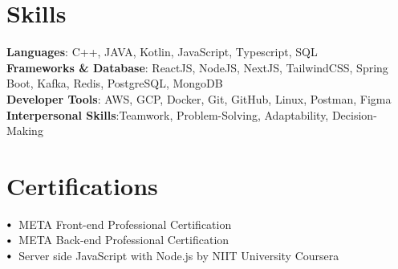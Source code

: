 \documentclass[letterpaper,11pt]{article}
\newcommand\sbullet[1][.5]{\mathbin{\vcenter{\hbox{\scalebox{#1}{$\bullet$}}}}}
\begin{document}
\section{Skills}
 \begin{itemize}[leftmargin=0.15in, label={}]
    \small{\item{
     \textbf{Languages}{: C++, JAVA, Kotlin, JavaScript, Typescript, SQL} \\
     \vspace{2pt}
     \textbf{Frameworks \& Database}{: ReactJS, NodeJS, NextJS, TailwindCSS, Spring Boot, Kafka, Redis, PostgreSQL, MongoDB} \\
     \vspace{2pt}
     \textbf{Developer Tools}{: AWS, GCP, Docker, Git, GitHub, Linux, Postman, Figma} \\
     \vspace{2pt}
     \textbf{Interpersonal Skills}{:Teamwork, Problem-Solving, Adaptability, Decision-Making} \\
    }}
 \end{itemize}
 \vspace{-14pt}

\section{Certifications}

$\sbullet[.75] \hspace{0.1cm}$ 
{{META Front-end Professional Certification}} {\href{https://coursera.org/share/0a950a3994e4aa550d83de3a782688bc}{\raisebox{-0.1\height}\faExternalLink }}
\hspace{2cm}\\

$\sbullet[.75] \hspace{0.1cm}$ 
{{META Back-end  Professional Certification}} {\href{https://coursera.org/share/f0c890d8a5227e31c6542d93b11cdc7b}{\raisebox{-0.1\height}\faExternalLink }}
\hspace{2cm}\\

$\sbullet[.75] \hspace{0.1cm}$ 
{{Server side JavaScript with Node.js by NIIT University Coursera}} 
{\href{https://coursera.org/share/96ca45ce071f58aa4d48d638a4de519a}{\raisebox{-0.1\height}\faExternalLink }}
\hspace{8cm}\\
\end{document}
